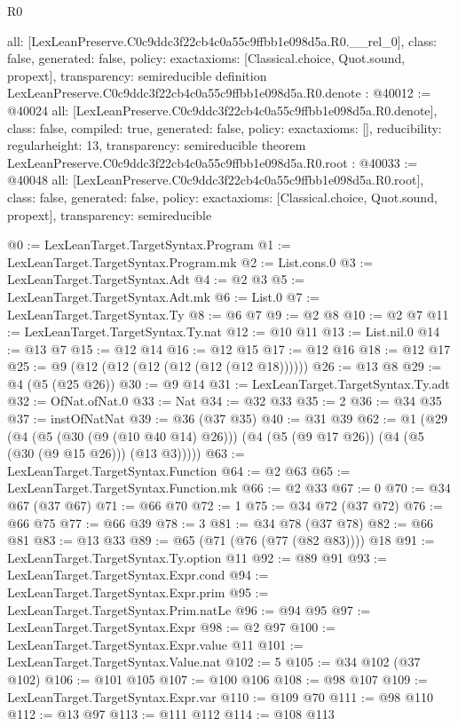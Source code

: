 \begin{lexlean}{R0}
\begin{coremodule}
{  all: [LexLeanPreserve.C0c9ddc3f22cb4c0a55c9ffbb1e098d5a.R0.__rel_0],
  class: false,
  generated: false,
  policy: exact{axioms: [Classical.choice, Quot.sound, propext]},
  transparency: semireducible
}
definition LexLeanPreserve.C0c9ddc3f22cb4c0a55c9ffbb1e098d5a.R0.denote : @40012 := @40024 {
  all: [LexLeanPreserve.C0c9ddc3f22cb4c0a55c9ffbb1e098d5a.R0.denote],
  class: false,
  compiled: true,
  generated: false,
  policy: exact{axioms: []},
  reducibility: regular{height: 13},
  transparency: semireducible
}
theorem LexLeanPreserve.C0c9ddc3f22cb4c0a55c9ffbb1e098d5a.R0.root : @40033 := @40048 {
  all: [LexLeanPreserve.C0c9ddc3f22cb4c0a55c9ffbb1e098d5a.R0.root],
  class: false,
  generated: false,
  policy: exact{axioms: [Classical.choice, Quot.sound, propext]},
  transparency: semireducible
}

@0 := LexLeanTarget.TargetSyntax.Program
@1 := LexLeanTarget.TargetSyntax.Program.mk
@2 := List.cons.{0}
@3 := LexLeanTarget.TargetSyntax.Adt
@4 := @2 @3
@5 := LexLeanTarget.TargetSyntax.Adt.mk
@6 := List.{0}
@7 := LexLeanTarget.TargetSyntax.Ty
@8 := @6 @7
@9 := @2 @8
@10 := @2 @7
@11 := LexLeanTarget.TargetSyntax.Ty.nat
@12 := @10 @11
@13 := List.nil.{0}
@14 := @13 @7
@15 := @12 @14
@16 := @12 @15
@17 := @12 @16
@18 := @12 @17
@25 := @9 (@12 (@12 (@12 (@12 (@12 (@12 @18))))))
@26 := @13 @8
@29 := @4 (@5 (@25 @26))
@30 := @9 @14
@31 := LexLeanTarget.TargetSyntax.Ty.adt
@32 := OfNat.ofNat.{0}
@33 := Nat
@34 := @32 @33
@35 := 2
@36 := @34 @35
@37 := instOfNatNat
@39 := @36 (@37 @35)
@40 := @31 @39
@62 := @1
    (@29
      (@4
        (@5 (@30 (@9 (@10 @40 @14) @26)))
        (@4 (@5 (@9 @17 @26)) (@4 (@5 (@30 (@9 @15 @26))) (@13 @3)))))
@63 := LexLeanTarget.TargetSyntax.Function
@64 := @2 @63
@65 := LexLeanTarget.TargetSyntax.Function.mk
@66 := @2 @33
@67 := 0
@70 := @34 @67 (@37 @67)
@71 := @66 @70
@72 := 1
@75 := @34 @72 (@37 @72)
@76 := @66 @75
@77 := @66 @39
@78 := 3
@81 := @34 @78 (@37 @78)
@82 := @66 @81
@83 := @13 @33
@89 := @65 (@71 (@76 (@77 (@82 @83)))) @18
@91 := LexLeanTarget.TargetSyntax.Ty.option @11
@92 := @89 @91
@93 := LexLeanTarget.TargetSyntax.Expr.cond
@94 := LexLeanTarget.TargetSyntax.Expr.prim
@95 := LexLeanTarget.TargetSyntax.Prim.natLe
@96 := @94 @95
@97 := LexLeanTarget.TargetSyntax.Expr
@98 := @2 @97
@100 := LexLeanTarget.TargetSyntax.Expr.value @11
@101 := LexLeanTarget.TargetSyntax.Value.nat
@102 := 5
@105 := @34 @102 (@37 @102)
@106 := @101 @105
@107 := @100 @106
@108 := @98 @107
@109 := LexLeanTarget.TargetSyntax.Expr.var
@110 := @109 @70
@111 := @98 @110
@112 := @13 @97
@113 := @111 @112
@114 := @108 @113

\end{coremodule}
\end{lexlean}
